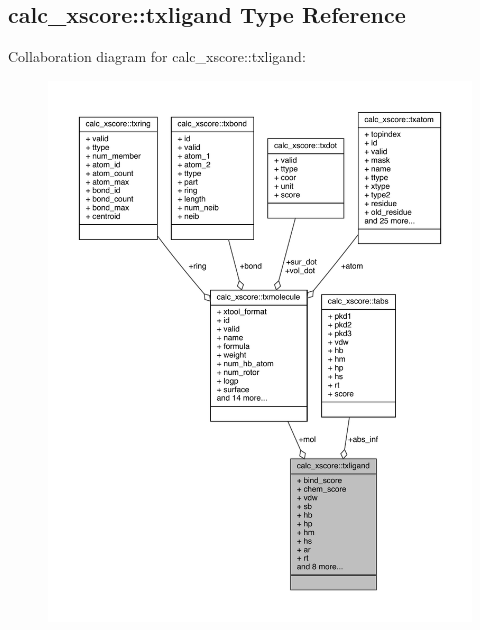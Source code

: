 \hypertarget{structcalc__xscore_1_1txligand}{\subsection{calc\-\_\-xscore\-:\-:txligand Type Reference}
\label{structcalc__xscore_1_1txligand}
}


Collaboration diagram for calc\-\_\-xscore\-:\-:txligand\-:
\nopagebreak
\begin{figure}[H]
\begin{center}
\leavevmode
\includegraphics[width=350pt]{structcalc__xscore_1_1txligand__coll__graph}
\end{center}
\end{figure}
